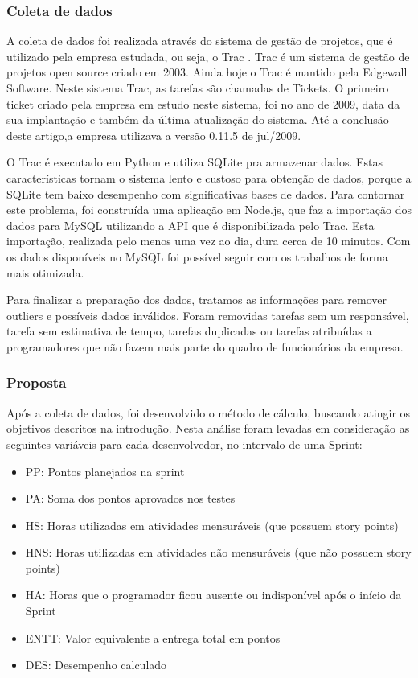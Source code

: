 \subsubsection{Coleta de dados}
A coleta de dados foi realizada através do sistema de gestão de projetos, que é utilizado pela empresa estudada, ou seja, o Trac \cite{TracProject}. Trac é um sistema de gestão de projetos open source criado em 2003. Ainda hoje o Trac é mantido pela Edgewall Software. Neste sistema Trac, as tarefas são chamadas de Tickets. O primeiro ticket criado pela empresa em estudo neste sistema, foi no ano de 2009, data da sua implantação e também da última atualização do sistema. Até a conclusão deste artigo,a empresa utilizava a versão 0.11.5 de jul/2009.\par
O Trac é executado em Python e utiliza SQLite pra armazenar dados. Estas características tornam o sistema lento e custoso para obtenção de dados, porque a SQLite tem baixo desempenho com significativas bases de dados. Para contornar este problema, foi construída uma aplicação em Node.js, que faz a importação dos dados para MySQL utilizando a API que é disponibilizada pelo Trac. Esta importação, realizada pelo menos uma vez ao dia, dura cerca de 10 minutos. Com os dados disponíveis no MySQL foi possível seguir com os trabalhos de forma mais otimizada. \par
Para finalizar a preparação dos dados, tratamos as informações para remover outliers e possíveis dados inválidos. Foram removidas tarefas sem um responsável, tarefa sem estimativa de tempo, tarefas duplicadas ou tarefas atribuídas a programadores que não fazem mais parte do quadro de funcionários da empresa.\par

\subsubsection{Proposta}

Após a coleta de dados, foi desenvolvido o método de cálculo, buscando atingir os objetivos descritos na introdução. Nesta análise foram levadas em consideração as seguintes variáveis para cada desenvolvedor, no intervalo de uma Sprint:

\begin{itemize}
    \item PP: Pontos planejados na sprint
    \item PA: Soma dos pontos aprovados nos testes
    \item HS: Horas utilizadas em atividades mensuráveis (que possuem story points)
    \item HNS: Horas utilizadas em atividades não mensuráveis (que não possuem story points)
    \item HA: Horas que o programador ficou ausente ou indisponível após o início da Sprint
    \item ENTT: Valor equivalente a entrega total em pontos
    \item DES: Desempenho calculado
\end{itemize}


